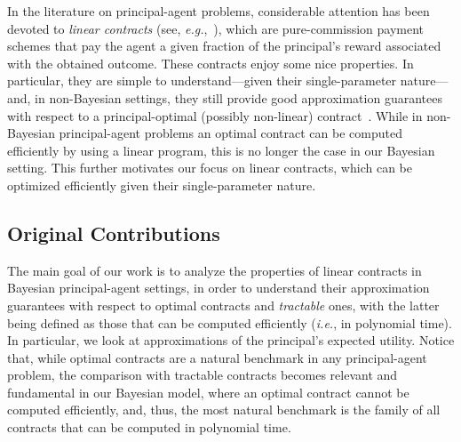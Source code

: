 In the literature on principal-agent problems, considerable attention has been devoted to \emph{linear contracts} (see, \emph{e.g.},~\cite{carroll2015robustness,carroll2019robustness,dutting2019simple}), which are pure-commission payment schemes that pay the agent a given fraction of the principal's reward associated with the obtained outcome.
%
These contracts enjoy some nice properties.
%
In particular, they are simple to understand---given their single-parameter nature---and, in non-Bayesian settings, they still provide good approximation guarantees with respect to a principal-optimal (possibly non-linear) contract~\citep{dutting2019simple}.
%
While in non-Bayesian principal-agent problems an optimal contract can be computed efficiently by using a linear program, this is no longer the case in our Bayesian setting.
%
This further motivates our focus on {linear contracts}, which can be optimized efficiently given their single-parameter nature.


\subsection{Original Contributions}

The main goal of our work is to analyze the properties of linear contracts in Bayesian principal-agent settings, in order to understand their approximation guarantees with respect to optimal contracts and \emph{tractable} ones, with the latter being defined as those that can be computed efficiently (\emph{i.e.}, in polynomial time).
%
In particular, we look at approximations of the principal's expected utility. 
%
Notice that, while optimal contracts are a natural benchmark in any principal-agent problem, the comparison with tractable contracts becomes relevant and fundamental in our Bayesian model, where an optimal contract cannot be computed efficiently, and, thus, the most natural benchmark is the family of all contracts that can be computed in polynomial time. 
%


